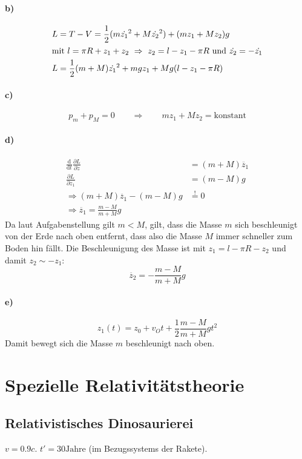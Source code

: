 \documentclass[oneside]{book}
\theoremstyle{definition}
\renewcommand{\d}{\mathrm d}
\newcommand{\dd}[1]{\frac{\d}{\d #1}}
\newcommand{\ffpartial}[2]{\frac{\partial #1}{\partial #2}}
\newcommand{\const}{\text{konstant}}
\begin{document}
\paragraph{b)}
\begin{align*}
	L &= T - V = \frac12 (m \dot{z_1}^2 + M \dot{z_2}^2) + (mz_1 + Mz_2) g\\
	\intertext{mit $l = \pi R + z_1 + z_2 ~\Rightarrow~ z_2 = l - z_1 - \pi R$ und $\dot{z_2} = - \dot{z_1}$}
	L &= \frac12 (m + M) \dot{z_1}^2 + mg z_1 + Mg (l - z_1 - \pi R)
\end{align*}

\paragraph{c)}
$$p_m + p_M = 0 \qquad \Rightarrow \qquad m z_1 + M z_2 = \const$$

\paragraph{d)}
\begin{align*}
	\dd{t} \ffpartial{L}{\dot{z}} &= (m + M) \ddot{z_1}\\
	\ffpartial{L}{z_1} &= (m - M) g\\
	\Rightarrow  (m + M) \ddot{z_1} - (m - M) g &\overset!= 0\\
	\Rightarrow \ddot{z_1} = \frac{m - M}{m + M} g
\end{align*}
Da laut Aufgabenstellung gilt $m < M$, gilt, dass die Masse $m$ sich beschleunigt von der Erde nach oben entfernt, dass also die Masse $M$ immer schneller zum Boden hin fällt. Die Beschleunigung des Masse ist mit $z_1 = l - \pi R - z_2$ und damit $z_2 \sim -z_1$:
$$\ddot{z_2} = -\frac{m - M}{m + M} g$$

\paragraph{e)}
$$z_1(t) = z_0 + v_O t + \frac12 \frac{m - M}{m + M} g t^2$$
Damit bewegt sich die Masse $m$ beschleunigt nach oben.

\section{Spezielle Relativitätstheorie}
\subsection{Relativistisches Dinosaurierei}
$v = 0.9c$. $t' = 30 \mathrm{Jahre}$ (im Bezugssystems der Rakete).
\end{document}

